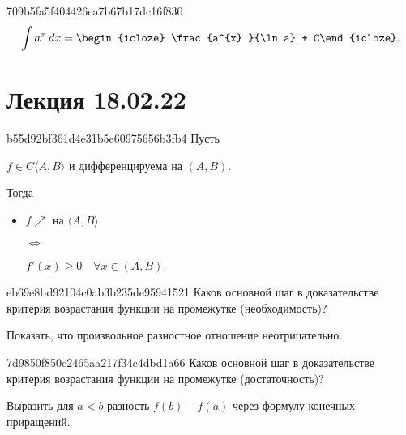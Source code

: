 \begin{note}{709b5fa5f404426ea7b67b17dc16f830}
    \[
        \int a^{x} \: dx = \begin{icloze}{1}\frac{a^{x} }{\ln a} + C\end{icloze}.
    \]
\end{note}

\section{Лекция 18.02.22}
\begin{note}{b55d92bf361d4e31b5e60975656b3fb4}
    Пусть \begin{icloze}{4}\( f \in C\langle A, B \rangle  \) и дифференцируема на \( (A, B) \).\end{icloze} Тогда
    \begin{itemize}
        \item {}\begin{icloze}{2}\( f \!\nearrow \) на \( \langle A, B \rangle  \)\end{icloze}
            \begin{icloze}{3}\( \iff  \)\end{icloze}
            \begin{icloze}{1}\( f'(x) \geqslant 0 \quad \forall x \in (A, B) \).\end{icloze}
    \end{itemize}
\end{note}

\begin{note}{eb69e8bd92104c0ab3b235de95941521}
    Каков основной шаг в доказательстве критерия возрастания функции на промежутке (необходимость)?

    \begin{cloze}{1}
        Показать, что произвольное разностное отношение неотрицательно.
    \end{cloze}
\end{note}

\begin{note}{7d9850f850c2465aa217f34c4dbd1a66}
    Каков основной шаг в доказательстве критерия возрастания функции на промежутке (достаточность)?

    \begin{cloze}{1}
        Выразить для \( a < b \) разность \( f(b) - f(a) \) через формулу конечных приращений.
    \end{cloze}
\end{note}

